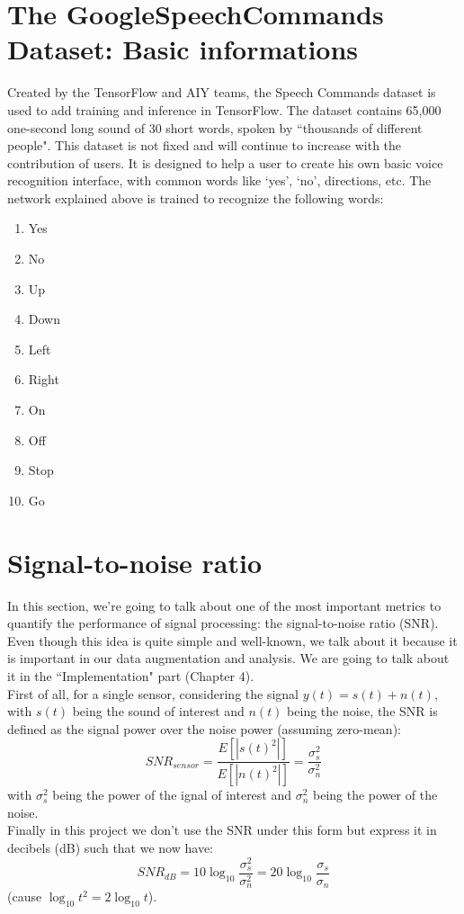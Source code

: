\documentclass[11pt,a4paper,titlepage]{report}
\providecommand{\tightlist}{%
	\setlength{\itemsep}{0pt}\setlength{\parskip}{0pt}}
\begin{document}
\section{The GoogleSpeechCommands Dataset: Basic informations}
\label{sec:google}
\hspace*{0.6cm}
Created by the TensorFlow and AIY teams, the Speech Commands dataset is used to add training and inference in TensorFlow. The dataset contains 65,000 one-second long sound of 30 short words, spoken by ``thousands of different people".\cite{googlespeech} This dataset is not fixed and will continue to increase with the contribution of users. It is designed to help a user to create his own basic voice recognition interface, with common words like `yes', `no', directions, etc. The network explained above is trained to recognize the following words:
\begin{enumerate}
	\tightlist
	\item Yes
	\item No
	\item Up
	\item Down
	\item Left
	\item Right
	\item On
	\item Off
	\item Stop
	\item Go
\end{enumerate}


\section{Signal-to-noise ratio}
\label{sec:Signal processing concepts}
\hspace*{0.6cm}
In this section, we're going to talk about one of the most important metrics to quantify the performance of signal processing: the signal-to-noise ratio (SNR)\cite{SNR}. Even though this idea is quite simple and well-known, we talk about it because it is important in our data augmentation and analysis. We are going to talk about it in the ``Implementation" part (Chapter 4).\\
\hspace*{0.6cm}
First of all, for a single sensor, considering the signal $ y(t) = s(t) + n(t) $, with $ s(t) $ being the sound of interest and $ n(t) $ being the noise, the SNR is defined as the signal power over the noise power (assuming zero-mean):
\begin{equation}
SNR_{sensor} = \dfrac{E[|s(t)^2|]}{E[|n(t)^2|]} = \dfrac{\sigma_{s}^2}{\sigma_{n}^2} 
\end{equation}
with $\sigma_{s}^2$ being the power of the ignal of interest and $\sigma_{n}^2$ being the power of the noise.\\
Finally in this project we don't use the SNR under this form but express it in decibels (dB) such that we now have:
\begin{equation}
SNR_{dB} = 10\log_{10}{\dfrac{\sigma_{s}^2}{\sigma_{n}^2}} = 20\log_{10}{\dfrac{\sigma_{s}}{\sigma_{n}}} 
\end{equation}
\hspace*{3.4cm}(cause $\log_{10}{t^2} = 2\log_{10}{t}$).
\end{document}
